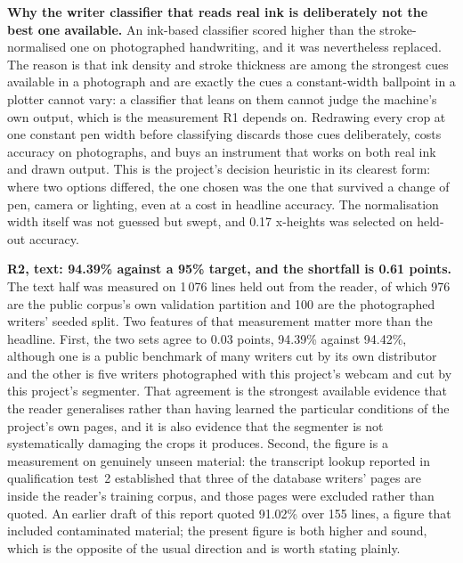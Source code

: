         \textbf{Why the writer classifier that reads real ink is deliberately not the best one available.}
        An ink-based classifier scored higher than the stroke-normalised one on photographed handwriting, and it was nevertheless replaced.
        The reason is that ink density and stroke thickness are among the strongest cues available in a photograph and are exactly the cues a constant-width ballpoint in a plotter cannot vary: a classifier that leans on them cannot judge the machine's own output, which is the measurement R1 depends on.
        Redrawing every crop at one constant pen width before classifying discards those cues deliberately, costs accuracy on photographs, and buys an instrument that works on both real ink and drawn output.
        This is the project's decision heuristic in its clearest form: where two options differed, the one chosen was the one that survived a change of pen, camera or lighting, even at a cost in headline accuracy.
        The normalisation width itself was not guessed but swept, and 0.17 x-heights was selected on held-out accuracy.

        \textbf{R2, text: 94.39\% against a 95\% target, and the shortfall is 0.61 points.}
        The text half was measured on 1\,076 lines held out from the reader, of which 976 are the public corpus's own validation partition and 100 are the photographed writers' seeded split.
        Two features of that measurement matter more than the headline.
        First, the two sets agree to 0.03 points, 94.39\% against 94.42\%, although one is a public benchmark of many writers cut by its own distributor and the other is five writers photographed with this project's webcam and cut by this project's segmenter.
        That agreement is the strongest available evidence that the reader generalises rather than having learned the particular conditions of the project's own pages, and it is also evidence that the segmenter is not systematically damaging the crops it produces.
        Second, the figure is a measurement on genuinely unseen material: the transcript lookup reported in qualification test~2 established that three of the database writers' pages are inside the reader's training corpus, and those pages were excluded rather than quoted.
        An earlier draft of this report quoted 91.02\% over 155 lines, a figure that included contaminated material; the present figure is both higher and sound, which is the opposite of the usual direction and is worth stating plainly.

